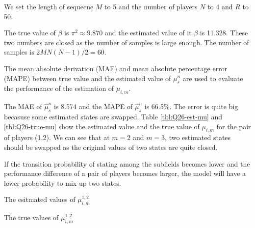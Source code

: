 \documentclass[12pt]{article}
\newenvironment{problem}[2][Problem]{\begin{trivlist}
\item[\hskip \labelsep {\bfseries #1}\hskip \labelsep {\bfseries #2.}]}{\end{trivlist}}
\begin{document}
\begin{problem}{2.6.20}
We set the length of sequecne $M$ to 5 and the number of players $N$ to 4 and $R$
to 50.


The true value of $\beta$ is $\pi^2 \approx 9.870$ and the estimated value of it
$\beta$ is 11.328. These two numbers are closed as the number of samples is 
large enough. The number of samples is $2MN(N-1)/2 = 60$.

The mean absolute derivation (MAE) and mean absolute percentage error (MAPE) 
between true value and the estimated value of $\mu^{n}_{s}$ are used to evaluate
the performance of the estimation of $\mu_{i,m}$.

The MAE of $\hat{\mu}^{n}_{s}$ is 8.574 and the MAPE of $\hat{\mu}^{n}_{s}$ is 
66.5\%. The error is quite big becasuse some estimated states are swapped. Table
\ref{tbl:Q26-est-mu} and \ref{tbl:Q26-true-mu} show the estimated value and 
the true value of $\mu_{i,m}$ for the pair of players (1,2). We can see that 
at $m = 2$ and $m = 3$, two estimated states should be swapped as the original values
of two states are quite closed.

If the transition probability of stating among the subfields becomes lower and 
the performance difference of a pair of players becomes larger, the model will 
have a lower probability to mix up two states.

\begin{table}
    \centering
    \caption{The esitmated values of $\mu^{1,2}_{i,m}$}\label{tbl:Q26-est-mu}
\end{table}

\begin{table}
    \centering
    \caption{The true values of $\mu^{1,2}_{i,m}$}\label{tbl:Q26-true-mu}
\end{table}  

\end{problem}
\pagebreak
\end{document}
